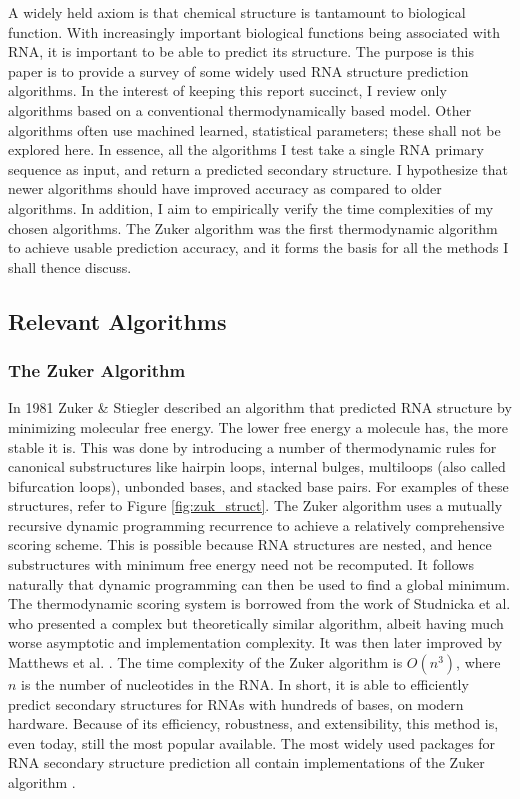 \documentclass[12pt, a4paper]{article}
\begin{document}
A widely held axiom is that chemical structure is tantamount to biological function. With increasingly important biological functions being associated with RNA, it is important to be able to predict its structure. The purpose is this paper is to provide a survey of some widely used RNA structure prediction algorithms. In the interest of keeping this report succinct, I review only algorithms based on a conventional thermodynamically based model. Other algorithms often use machined learned, statistical parameters; these shall not be explored here. In essence, all the algorithms I test take a single RNA primary sequence as input, and return a predicted secondary structure. I hypothesize that newer algorithms should have improved accuracy as compared to older algorithms. In addition, I aim to empirically verify the time complexities of my chosen algorithms. The Zuker algorithm was the first thermodynamic algorithm to achieve usable prediction accuracy, and it forms the basis for all the methods I shall thence discuss.

\subsection{Relevant Algorithms}
\subsubsection{The Zuker Algorithm}
In 1981 Zuker \& Stiegler \cite{zuker1981optimal}
described an algorithm that predicted RNA structure by minimizing molecular free energy. The lower free energy a molecule has, the more stable it is. This was done
by introducing a number of thermodynamic rules for canonical substructures like hairpin loops, internal bulges, multiloops (also called bifurcation loops), unbonded bases, and stacked base pairs. For examples of these structures, refer to Figure \ref{fig:zuk_struct}. The Zuker algorithm uses a mutually recursive dynamic programming recurrence to achieve a relatively comprehensive scoring scheme. This is possible because RNA structures are nested, and hence substructures with minimum free energy need not be recomputed. It follows naturally that dynamic programming can then be used to find a global minimum. The thermodynamic scoring system is borrowed from the work of Studnicka et al. \cite{studnicka1978computer} who presented a
complex but theoretically similar algorithm, albeit having
much worse asymptotic and implementation complexity. It was then later improved by Matthews et al. \cite{mathews1999expanded, mathews2004incorporating}. The time complexity of the Zuker algorithm is $O(n^3)$, where $n$ is the number of nucleotides in the RNA. In short, it is able to efficiently predict secondary structures for RNAs with hundreds of bases, on modern hardware.  Because of
its efficiency, robustness, and extensibility, this method is,
even today, still the most popular available. The most widely used packages for RNA secondary structure prediction all contain implementations of the Zuker algorithm \cite{lorenz2011viennarna, reuter2010rnastructure}.
\end{document}
